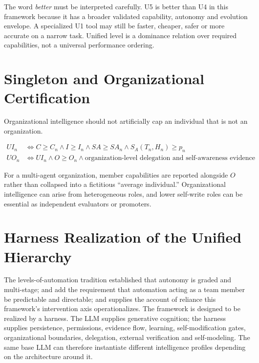 \documentclass[11pt]{article}
\theoremstyle{definition}
\begin{document}
The word \emph{better} must be interpreted carefully. U5 is better than U4 in this framework because it has a broader validated capability, autonomy and evolution envelope. A specialized U1 tool may still be faster, cheaper, safer or more accurate on a narrow task. Unified level is a dominance relation over required capabilities, not a universal performance ordering.

\section{Singleton and Organizational Certification}

Organizational intelligence should not artificially cap an individual that is not an organization.

\begin{align}
UI_n &\iff C \ge C_n \wedge I \ge I_n \wedge SA \ge SA_n \wedge S_A(T_n,H_n) \ge p_n\\
UO_n &\iff UI_n \wedge O \ge O_n \wedge \text{organization-level delegation and self-awareness evidence}
\end{align}

For a multi-agent organization, member capabilities are reported alongside $O$ rather than collapsed into a fictitious ``average individual.'' Organizational intelligence can arise from heterogeneous roles, and lower self-write roles can be essential as independent evaluators or promoters.

\section{Harness Realization of the Unified Hierarchy}

The levels-of-automation tradition \citep{sheridan1978,parasuraman2000,endsley1999} established that autonomy is graded and multi-stage; \citet{klein2004} and \citet{amershi2019} add the requirement that automation acting as a team member be predictable and directable; and \citet{lee2004} supplies the account of reliance this framework's intervention axis operationalizes. The framework is designed to be realized by a harness. The LLM supplies generative cognition; the harness supplies persistence, permissions, evidence flow, learning, self-modification gates, organizational boundaries, delegation, external verification and self-modeling. The same base LLM can therefore instantiate different intelligence profiles depending on the architecture around it.
\end{document}

